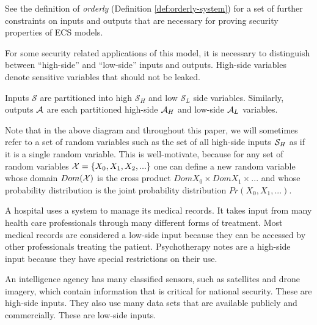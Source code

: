 \documentclass[../thesis.tex]{subfiles}
\begin{document}
See the definition of \emph{orderly} (Definition \ref{def:orderly-system})
for a set of further constraints on inputs and outputs
that are necessary for proving security properties of ECS models.

For some security related applications of this model,
it is necessary to distinguish between ``high-side''
and ``low-side'' inputs and outputs.
High-side variables denote sensitive variables
that should not be leaked.

\begin{dfn}
  Inputs $\mathcal{S}$ are partitioned into high $\mathcal{S}_H$
  and low $\mathcal{S}_L$ side variables.
  Similarly, outputs $\mathcal{A}$ are each partitioned
  high-side $\mathcal{A}_H$ and low-side $\mathcal{A}_L$ variables.
\end{dfn}
\begin{center}
\end{center}

Note that in the above diagram and throughout this paper,
we will sometimes refer to a set of random variables
such as the set of all high-side inputs $\mathcal{S}_H$
as if it is a single random variable.
This is well-motivate, because for any set of random
variables $\mathcal{X} = \{X_0, X_1, X_2, ...\}$
one can define a new random variable
whose domain $Dom(\mathcal{X})$ is the cross product
$Dom{X_0} \times Dom{X_1} \times ...$ and whose
probability distribution is the joint probability
distribution $Pr(X_0, X_1, ...)$.

\begin{exm}
  A hospital uses a system to manage its medical records.
  It takes input from many health care professionals through
  many different forms of treatment.
  Most medical records are considered a low-side input
  because they can be accessed by other professionals
  treating the patient.
  Psychotherapy notes are a high-side input because they
  have special restrictions on their use.
\end{exm}

\begin{exm}
  An intelligence agency has many classified sensors,
  such as satellites and drone imagery, which contain information
  that is critical for national security.
  These are high-side inputs.
  They also use many data sets that are available publicly
  and commercially.
  These are low-side inputs.
\end{exm}
\end{document}
